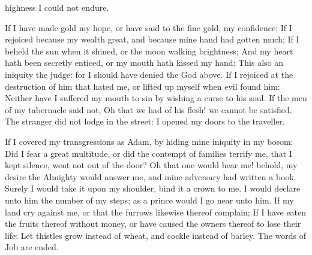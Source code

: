 {highness I
could not endure.
\par }{\PP {}If I have
made
gold my
hope, or have
said to the fine
gold,
{} my
confidence;
If I
rejoiced because my
wealth
{}
great, and because mine
hand had
gotten
much;
If I
beheld the
sun when it
shined, or the
moon
walking
{}
brightness;
And my
heart hath been
secretly
enticed, or my
mouth hath
kissed my
hand:
This also
{} an
iniquity
{} the
judge: for I should have
denied the
God
{}
above.
If I
rejoiced at the
destruction of him that
hated me, or lifted
up myself when
evil
found him:
Neither have I
suffered my
mouth to
sin by
wishing a
curse to his
soul.
If the
men of my
tabernacle
said not, Oh that we
had of his
flesh! we cannot be
satisfied.
The
stranger did not
lodge in the
street:
{} I
opened my
doors to the
traveller.
\par }{\PP {}If I
covered my
transgressions as
Adam, by
hiding mine
iniquity in my
bosom:
Did I
fear a
great
multitude, or did the
contempt of
families
terrify me, that I kept
silence,
{} went not
out of the
door?
Oh
that one would
hear me! behold, my
desire
{} the
Almighty would
answer me, and
{} mine
adversary had
written a
book.
Surely I would
take it upon my
shoulder,
{}
bind it
{} a
crown to me.
I would
declare unto him the
number of my
steps; as a
prince would I go
near unto him.
If my
land
cry against me, or that the
furrows
likewise thereof
complain;
If I have
eaten the
fruits thereof without
money, or have caused the
owners thereof to
lose their
life:
Let
thistles
grow instead of
wheat, and
cockle instead of
barley. The
words of
Job are
ended.

}
